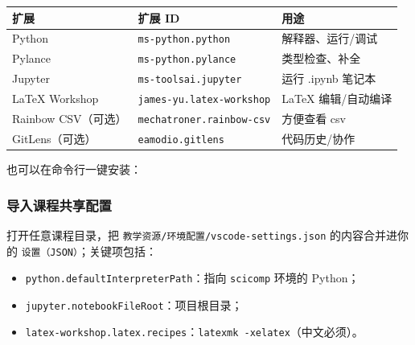{\def\LTcaptype{none} %
\begin{longtable}[]{@{}lll@{}}
\toprule\noalign{}
扩展 & 扩展 ID & 用途 \\
\midrule\noalign{}
\endhead
\bottomrule\noalign{}
\endlastfoot
Python & \texttt{ms-python.python} & 解释器、运行/调试 \\
Pylance & \texttt{ms-python.pylance} & 类型检查、补全 \\
Jupyter & \texttt{ms-toolsai.jupyter} & 运行 .ipynb 笔记本 \\
LaTeX Workshop & \texttt{james-yu.latex-workshop} & LaTeX
编辑/自动编译 \\
Rainbow CSV（可选） & \texttt{mechatroner.rainbow-csv} & 方便查看 csv \\
GitLens（可选） & \texttt{eamodio.gitlens} & 代码历史/协作 \\
\end{longtable}
}

也可以在命令行一键安装：

\begin{Shaded}
\begin{Highlighting}[]
\OperatorTok{{-}{-}}
\OperatorTok{{-}{-}}
\OperatorTok{{-}{-}}
\OperatorTok{{-}{-}}\OperatorTok{{-}}
\end{Highlighting}
\end{Shaded}

\subsubsection{导入课程共享配置}\label{ux5bfcux5165ux8bfeux7a0bux5171ux4eabux914dux7f6e}

打开任意课程目录，把 \texttt{教学资源/环境配置/vscode-settings.json}
的内容合并进你的 \texttt{设置（JSON）}；关键项包括：

\begin{itemize}
\tightlist
\item
  \texttt{python.defaultInterpreterPath}：指向 \texttt{scicomp} 环境的
  Python；
\item
  \texttt{jupyter.notebookFileRoot}：项目根目录；
\item
  \texttt{latex-workshop.latex.recipes}：\texttt{latexmk\ -xelatex}（中文必须）。
\end{itemize}


